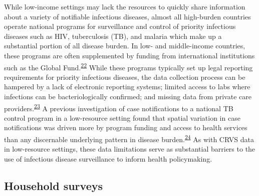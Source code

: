 \documentclass[
]{article}
\begin{document}
While low-income settings may lack the resources to quickly share information about a variety of notifiable infectious diseases, almost all high-burden countries operate national programs for surveillance and control of priority infectious diseases such as HIV, tuberculosis (TB), and malaria which make up a substantial portion of all disease burden. In low- and middle-income countries, these programs are often supplemented by funding from international institutions such as the Global Fund.\textsuperscript{\protect\hyperlink{ref-Mauch2010}{22}} While these programs typically set up legal reporting requirements for priority infectious diseases, the data collection process can be hampered by a lack of electronic reporting systems; limited access to labs where infections can be bacteriologically confirmed; and missing data from private care providers.\textsuperscript{\protect\hyperlink{ref-Uplekar2016}{23}} A previous investigation of case notifications to a national TB control program in a low-resource setting found that spatial variation in case notifications was driven more by program funding and access to health services than any discernable underlying pattern in disease burden.\textsuperscript{\protect\hyperlink{ref-Rood2019}{24}} As with CRVS data in low-resource settings, these data limitations serve as substantial barriers to the use of infectious disease surveillance to inform health policymaking.

\hypertarget{household-surveys}{%
\subsection{Household surveys}\label{household-surveys}}
\end{document}

